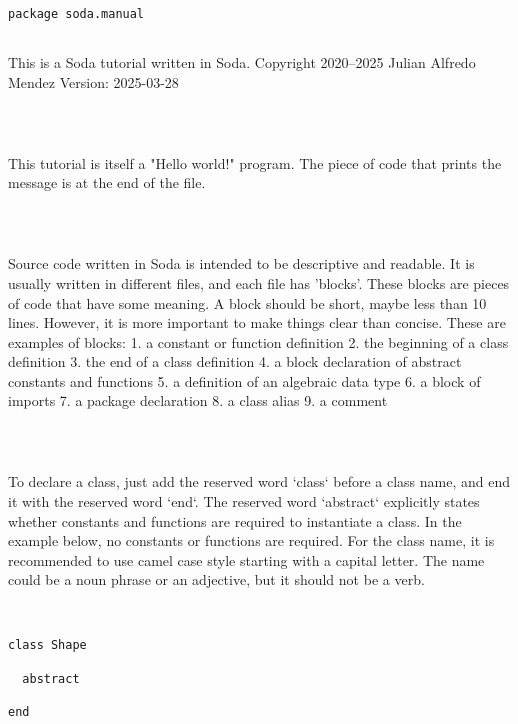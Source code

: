 \documentclass[12pt,a4paper]{article}
\begin{document}
\begin{lstlisting}
package soda.manual


\end{lstlisting}

This is a Soda tutorial written in Soda.
 Copyright 2020--2025 Julian Alfredo Mendez
 Version: 2025-03-28


\begin{lstlisting}



\end{lstlisting}

This tutorial is itself a "Hello world!" program.
 The piece of code that prints the message is at the end of the file.


\begin{lstlisting}



\end{lstlisting}

Source code written in Soda is intended to be descriptive and readable.
 It is usually written in different files, and each file has 'blocks'.
 These blocks are pieces of code that have some meaning.
 A block should be short, maybe less than 10 lines.
 However, it is more important to make things clear than concise.
 These are examples of blocks:
 1. a constant or function definition
 2. the beginning of a class definition
 3. the end of a class definition
 4. a block declaration of abstract constants and functions
 5. a definition of an algebraic data type
 6. a block of imports
 7. a package declaration
 8. a class alias
 9. a comment


\begin{lstlisting}



\end{lstlisting}

To declare a class, just add the reserved word `class` before a class name, and end it with
 the reserved word `end`.
 The reserved word `abstract` explicitly states whether constants and functions are required
 to instantiate a class. In the example below, no constants or functions are required.
 For the class name, it is recommended to use camel case style starting with a capital letter.
 The name could be a noun phrase or an adjective, but it should not be a verb.


\begin{lstlisting}


class Shape

  abstract

end


\end{lstlisting}
\end{document}
